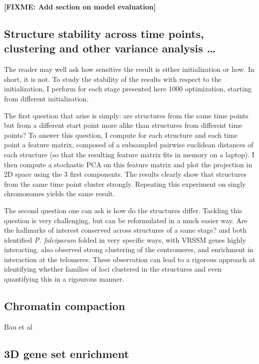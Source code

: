\documentclass[letterpaper,12pt]{article}
\newcommand{\fixme}[1]{\textbf{[FIXME: #1]}}
\begin{document}
\fixme{Add section on model evaluation}



\subsection*{Structure stability across time points, clustering and other
variance analysis \dots}

The reader may well ask how sensitive the result is either initialization or
how. In short, it is not. To study the stability of the results with respect
to the initialization, I perform for each stage presented here 1000
optimization, starting from different initialization. 

The first question that arise is simply: are structures from the same time
points but from a different start point more alike than structures from
different time points? To answer this question, I compute for each structure
and each time point a feature matrix, composed of a subsampled pairwise
euclidean distances of each structure (so that the resulting feature matrix
fits in memory on a laptop). I then compute a stochastic PCA on this feature
matrix and plot the projection in 2D space using the 3 first components. The
results clearly show that structures from the same time point cluster
strongly. Repeating this experiment on singly chromosomes yields the same
result.

The second question one can ask is how do the structures differ. Tackling this
question is very challenging, but can be reformulated in a much easier way.
Are the hallmarks of interest conserved across structures of a same stage?
\citet{ay:three-dimensional} and \citet{lemieux:genome-wide} both identified
{\em P. falciparum} folded in very specific ways, with VRSSM genes highly
interacting. \citet{ay:three-dimensional} also observed strong clustering of
the centromeres, and enrichment in interaction at the telomeres. These
observation can lead to a rigorous approach at identifying whether families
of loci clustered in the structures and even quantifying this in a rigourous
manner.

\subsection*{Chromatin compaction}

Bau et al


\subsection*{3D gene set enrichment}
\end{document}
